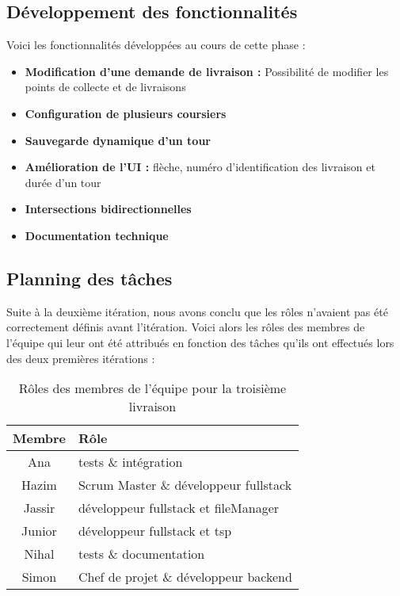 \documentclass[a4paper]{article}
\begin{document}
\subsection{Développement des fonctionnalités}
Voici les fonctionnalités développées au cours de cette phase :
\begin{itemize}
    \item \textbf{Modification d'une demande de livraison :} Possibilité de modifier les points de collecte et de livraisons
    \item \textbf{Configuration de plusieurs coursiers} 
    \item \textbf{Sauvegarde dynamique d’un tour} 
    \item \textbf{Amélioration de l’UI :} flèche, numéro d’identification des livraison et durée d’un tour
    \item \textbf{Intersections bidirectionnelles}
    \item \textbf{Documentation technique}
\end{itemize}

\subsection{Planning des tâches}
Suite à la deuxième itération, nous avons conclu que les rôles n'avaient pas été correctement définis avant l'itération. Voici alors les rôles des membres de l'équipe qui leur ont été attribués en fonction des tâches qu'ils ont effectués lors des deux premières itérations :

\begin{table}[H]
    \centering
    \begin{tabularx}{0.6\textwidth}{|c|X|}
    \hline
    \textbf{Membre} & \textbf{Rôle} \\ \hline
    Ana  & tests \& intégration \\ \hline
    Hazim & Scrum Master \& développeur fullstack \\ \hline
    Jassir & développeur fullstack et fileManager\\ \hline
    Junior &  développeur fullstack et tsp \\ \hline
    Nihal  & tests \& documentation \\ \hline
    Simon & Chef de projet \& développeur backend \\ \hline
    \end{tabularx}
    \caption{Rôles des membres de l'équipe pour la troisième livraison}
    \end{table}
\end{document}
